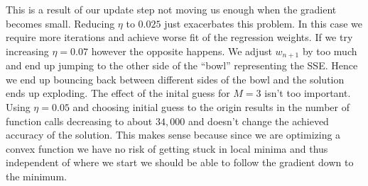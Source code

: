 \documentclass{article}
\begin{document}
This is a result of our update step not moving us enough when the gradient becomes small. Reducing $\eta$ to $0.025$ just exacerbates this problem. In this case we require more iterations and achieve worse fit of the regression weights. If we try increasing $\eta = 0.07$ however the opposite happens. We adjust $w_{n+1}$ by too much and end up jumping to the other side of the ``bowl'' representing the SSE. Hence we end up bouncing back between different sides of the bowl and the solution ends up exploding. The effect of the inital guess for $M = 3$ isn't too important. Using $\eta = 0.05$ and choosing initial guess to the origin results in the number of function calls decreasing to about $34,000$ and doesn't change the achieved accuracy of the solution. This makes sense because since we are optimizing a convex function we have no risk of getting stuck in local minima and thus independent of where we start we should be able to follow the gradient down to the minimum.
\end{document}
